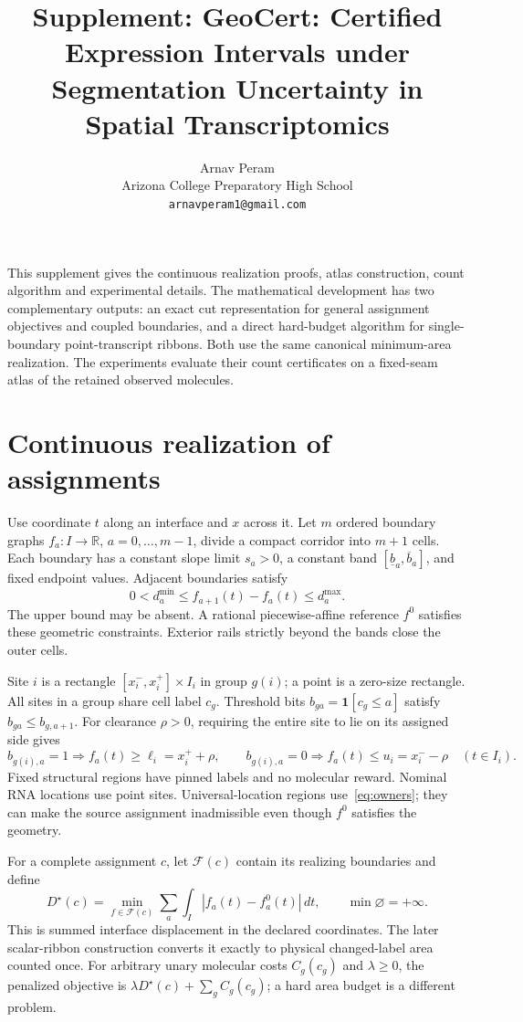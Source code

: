 \documentclass[10pt,letterpaper]{article}
\title{Supplement: GeoCert: Certified Expression Intervals under Segmentation Uncertainty in Spatial Transcriptomics}
\author{Arnav Peram\\[2pt]\normalsize Arizona College Preparatory High School\\\normalsize\texttt{arnavperam1@gmail.com}}\date{}
\newcommand{\R}{\mathbb R}
\newcommand{\F}{\mathcal F}
\newcommand{\ind}{\mathbf 1}
\begin{document}
\maketitle
This supplement gives the continuous realization proofs, atlas construction, count algorithm and experimental details. The mathematical development has two complementary outputs: an exact cut representation for general assignment objectives and coupled boundaries, and a direct hard-budget algorithm for single-boundary point-transcript ribbons. Both use the same canonical minimum-area realization. The experiments evaluate their count certificates on a fixed-seam atlas of the retained observed molecules.

\section{Continuous realization of assignments}\label{sec:continuous}
Use coordinate $t$ along an interface and $x$ across it. Let $m$ ordered boundary graphs $f_a:I\to\R$, $a=0,\ldots,m-1$, divide a compact corridor into $m+1$ cells. Each boundary has a constant slope limit $s_a>0$, a constant band $[\underline b_a,\overline b_a]$, and fixed endpoint values. Adjacent boundaries satisfy
\begin{equation}
0<d_a^{\min}\le f_{a+1}(t)-f_a(t)\le d_a^{\max}.\label{eq:gaps}
\end{equation}
The upper bound may be absent. A rational piecewise-affine reference $f^0$ satisfies these geometric constraints. Exterior rails strictly beyond the bands close the outer cells.

Site $i$ is a rectangle $[x_i^-,x_i^+]\times I_i$ in group $g(i)$; a point is a zero-size rectangle. All sites in a group share cell label $c_g$. Threshold bits $b_{ga}=\ind[c_g\le a]$ satisfy $b_{ga}\le b_{g,a+1}$. For clearance $\rho>0$, requiring the entire site to lie on its assigned side gives
\begin{equation}
 b_{g(i),a}=1\Rightarrow f_a(t)\ge \ell_i=x_i^++\rho,\qquad
 b_{g(i),a}=0\Rightarrow f_a(t)\le u_i=x_i^--\rho\quad(t\in I_i).\label{eq:owners}
\end{equation}
Fixed structural regions have pinned labels and no molecular reward. Nominal RNA locations use point sites. Universal-location regions use~\eqref{eq:owners}; they can make the source assignment inadmissible even though $f^0$ satisfies the geometry.

For a complete assignment $c$, let $\F(c)$ contain its realizing boundaries and define
\begin{equation}
D^\star(c)=\min_{f\in\F(c)}\sum_a\int_I |f_a(t)-f_a^0(t)|\,dt,
\qquad \min\varnothing=+\infty.\label{eq:dstar}
\end{equation}
This is summed interface displacement in the declared coordinates. The later scalar-ribbon construction converts it exactly to physical changed-label area counted once. For arbitrary unary molecular costs $C_g(c_g)$ and $\lambda\ge0$, the penalized objective is $\lambda D^\star(c)+\sum_g C_g(c_g)$; a hard area budget is a different problem.
\end{document}
